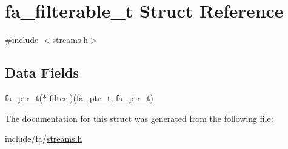 \hypertarget{structfa__filterable__t}{\section{fa\-\_\-filterable\-\_\-t Struct Reference}
\label{structfa__filterable__t}
}


{\ttfamily \#include $<$streams.\-h$>$}

\subsection*{Data Fields}
\begin{DoxyCompactItemize}
\item 
\hyperlink{group___fa_ga915ddeae99ad7568b273d2b876425197}{fa\-\_\-ptr\-\_\-t}($\ast$ \hyperlink{group___fa_ga6e1d216f4d9a9edc8882a8e101ccdabc}{filter} )(\hyperlink{group___fa_ga915ddeae99ad7568b273d2b876425197}{fa\-\_\-ptr\-\_\-t}, \hyperlink{group___fa_ga915ddeae99ad7568b273d2b876425197}{fa\-\_\-ptr\-\_\-t})
\end{DoxyCompactItemize}


The documentation for this struct was generated from the following file\-:\begin{DoxyCompactItemize}
\item 
include/fa/\hyperlink{streams_8h}{streams.\-h}\end{DoxyCompactItemize}
